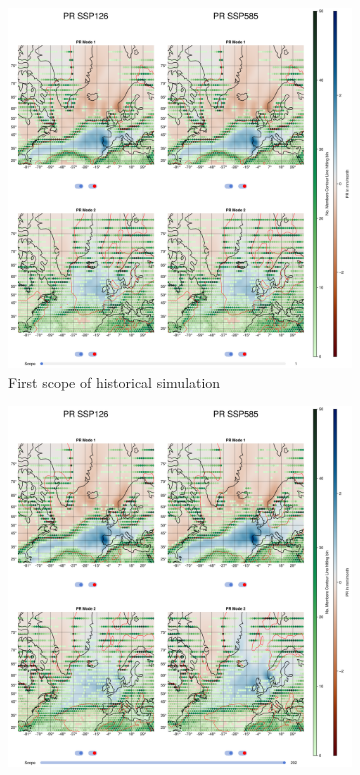 \begin{figure}[!bhtp]
    \centering
  \begin{subfigure}[b]{0.49\textwidth}
        \includegraphics[width=\textwidth]{figures/pr_eof_2modes_historical.png}
    \caption{First scope of historical simulation}
    \label{fig:pr spatial patterns historical}
  \end{subfigure}
  \hfill
  \begin{subfigure}[b]{0.49\textwidth}
        \includegraphics[width=\textwidth]{figures/pr_eof_2modes_endscenario.png}

\end{subfigure}
\end{figure}
